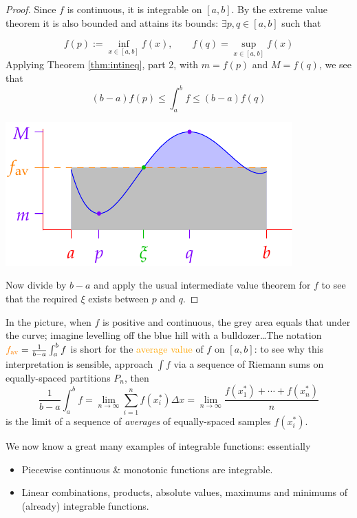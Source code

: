 \begin{proof}\squeezeeqn{8pt}
Since $f$ is continuous, it is integrable on $[a,b]$. By the extreme value theorem it is also bounded and attains its bounds: $\exists p,q\in[a,b]$ such that\par
\begin{minipage}[t]{0.55\linewidth}\vspace{-5pt}
\[f(p):=\inf\limits_{x\in[a,b]}f(x),\qquad f(q)=\sup\limits_{x\in[a,b]}f(x)\]
Applying Theorem \ref{thm:intineq}, part 2, with $m=f(p)$ and $M=f(q)$, we see that
\[(b-a)f(p)\le\int_a^bf\le (b-a)f(q)\]
\end{minipage}\begin{minipage}[t]{0.45\linewidth}\vspace{-5pt}
\flushright\includegraphics{average}
\end{minipage}\bigbreak

Now divide by $b-a$ and apply the usual intermediate value theorem for $f$ to see that the required $\xi$ exists between $p$ and $q$.
\end{proof}

In the picture, when $f$ is positive and continuous, the grey area equals that under the curve; imagine levelling off the blue hill with a bulldozer\ldots The notation $\textcolor{orange}{f_{\text{av}}}=\frac 1{b-a}\int_a^bf$ is short for the \textcolor{orange}{average value} of $f$ on $[a,b]$: to see why this interpretation is sensible, approach $\int f$ via a sequence of Riemann sums on equally-spaced partitions $P_n$, then
\[\frac 1{b-a}\int_a^b f =\lim_{n\to\infty}\sum_{i=1}^nf(x_i^*)\Delta x=\lim_{n\to\infty}\frac{f(x_1^*)+\cdots+f(x_n^*)}n\]
is the limit of a sequence of \emph{averages} of equally-spaced samples $f(x_i^*)$.

\goodbreak


We now know a great many examples of integrable functions: essentially
\begin{itemize}\itemsep0pt
  \item Piecewise continuous \& monotonic functions are integrable.
  \item Linear combinations, products, absolute values, maximums and minimums of (already) integrable functions.
\end{itemize}

